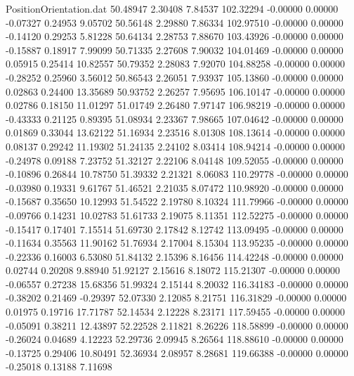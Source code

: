 \begin{filecontents}{PositionOrientation.dat}
  50.48947    2.30408    7.84537   102.32294   -0.00000    0.00000   -0.07327    0.24953    9.05702
  50.56148    2.29880    7.86334   102.97510   -0.00000    0.00000   -0.14120    0.29253    5.81228
  50.64134    2.28753    7.88670   103.43926   -0.00000    0.00000   -0.15887    0.18917    7.99099
  50.71335    2.27608    7.90032   104.01469   -0.00000    0.00000    0.05915    0.25414   10.82557
  50.79352    2.28083    7.92070   104.88258   -0.00000    0.00000   -0.28252    0.25960    3.56012
  50.86543    2.26051    7.93937   105.13860   -0.00000    0.00000    0.02863    0.24400   13.35689
  50.93752    2.26257    7.95695   106.10147   -0.00000    0.00000    0.02786    0.18150   11.01297
  51.01749    2.26480    7.97147   106.98219   -0.00000    0.00000   -0.43333    0.21125    0.89395
  51.08934    2.23367    7.98665   107.04642   -0.00000    0.00000    0.01869    0.33044   13.62122
  51.16934    2.23516    8.01308   108.13614   -0.00000    0.00000    0.08137    0.29242   11.19302
  51.24135    2.24102    8.03414   108.94214   -0.00000    0.00000   -0.24978    0.09188    7.23752
  51.32127    2.22106    8.04148   109.52055   -0.00000    0.00000   -0.10896    0.26844   10.78750
  51.39332    2.21321    8.06083   110.29778   -0.00000    0.00000   -0.03980    0.19331    9.61767
  51.46521    2.21035    8.07472   110.98920   -0.00000    0.00000   -0.15687    0.35650   10.12993
  51.54522    2.19780    8.10324   111.79966   -0.00000    0.00000   -0.09766    0.14231   10.02783
  51.61733    2.19075    8.11351   112.52275   -0.00000    0.00000   -0.15417    0.17401    7.15514
  51.69730    2.17842    8.12742   113.09495   -0.00000    0.00000   -0.11634    0.35563   11.90162
  51.76934    2.17004    8.15304   113.95235   -0.00000    0.00000   -0.22336    0.16003    6.53080
  51.84132    2.15396    8.16456   114.42248   -0.00000    0.00000    0.02744    0.20208    9.88940
  51.92127    2.15616    8.18072   115.21307   -0.00000    0.00000   -0.06557    0.27238   15.68356
  51.99324    2.15144    8.20032   116.34183   -0.00000    0.00000   -0.38202    0.21469   -0.29397
  52.07330    2.12085    8.21751   116.31829   -0.00000    0.00000    0.01975    0.19716   17.71787
  52.14534    2.12228    8.23171   117.59455   -0.00000    0.00000   -0.05091    0.38211   12.43897
  52.22528    2.11821    8.26226   118.58899   -0.00000    0.00000   -0.26024    0.04689    4.12223
  52.29736    2.09945    8.26564   118.88610   -0.00000    0.00000   -0.13725    0.29406   10.80491
  52.36934    2.08957    8.28681   119.66388   -0.00000    0.00000   -0.25018    0.13188    7.11698

\end{filecontents}
